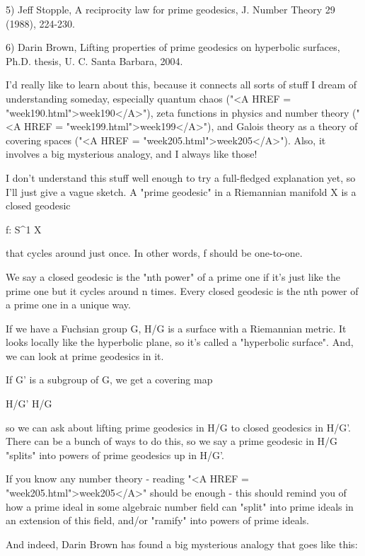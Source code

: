 5) Jeff Stopple, A reciprocity law for prime geodesics, J. Number 
Theory 29 (1988), 224-230.

6) Darin Brown, Lifting properties of prime geodesics on hyperbolic
surfaces, Ph.D. thesis, U. C. Santa Barbara, 2004.

I'd really like to learn about this, because it connects all sorts
of stuff I dream of understanding someday, especially quantum chaos 
("<A HREF = "week190.html">week190</A>"), zeta functions in physics and number theory ("<A HREF = "week199.html">week199</A>"), 
and Galois theory as a theory of covering spaces ("<A HREF = "week205.html">week205</A>").  Also, 
it involves a big mysterious analogy, and I always like those!

I don't understand this stuff well enough to try a full-fledged
explanation yet, so I'll just give a vague sketch.  A "prime geodesic"
in a Riemannian manifold X is a closed geodesic 

f: S^{1} \to  X

that cycles around just once.  In other words, f should be one-to-one.

We say a closed geodesic is the "nth power" of a prime one if it's
just like the prime one but it cycles around n times.  Every closed
geodesic is the nth power of a prime one in a unique way.

If we have a Fuchsian group G, H/G is a surface with a Riemannian
metric.  It looks locally like the hyperbolic plane, so it's called
a "hyperbolic surface".  And, we can look at prime geodesics in it.  

If G' is a subgroup of G, we get a covering map

H/G' \to  H/G

so we can ask about lifting prime geodesics in H/G to closed geodesics
in H/G'.   There can be a bunch of ways to do this, so we say a
prime geodesic in H/G "splits" into powers of prime geodesics up in
H/G'.  

If you know any number theory - reading "<A HREF = "week205.html">week205</A>" should be enough -
this should remind you of how a prime ideal in some algebraic number 
field can "split" into prime ideals in an extension of this field, 
and/or "ramify" into powers of prime ideals.

And indeed, Darin Brown has found a big mysterious analogy that goes 
like this:



